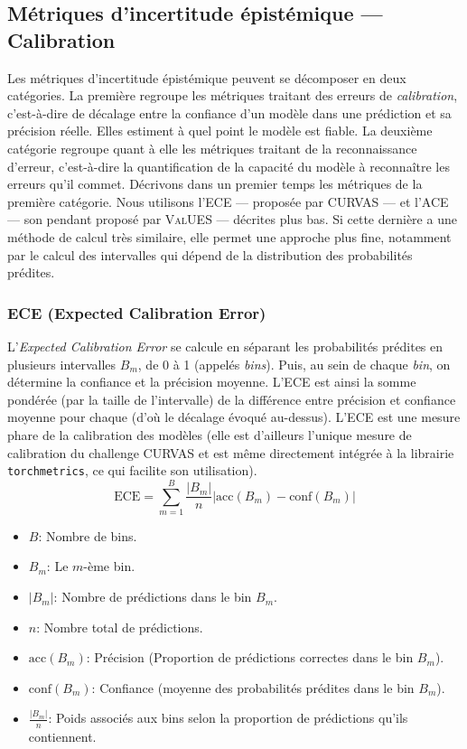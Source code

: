 \documentclass[a4paper,french,bookmarks,12pt]{article}
\begin{document}
    \subsection{Métriques d'incertitude épistémique --- Calibration}

    Les métriques d'incertitude épistémique peuvent se décomposer en deux catégories. La première regroupe les métriques traitant des erreurs de \emph{calibration}, c'est-à-dire de décalage entre la confiance d'un modèle dans une prédiction et sa précision réelle. Elles estiment à quel point le modèle est fiable. La deuxième catégorie regroupe quant à elle les métriques traitant de la reconnaissance d'erreur, c'est-à-dire la quantification de la capacité du modèle à reconnaître les erreurs qu'il commet. Décrivons dans un premier temps les métriques de la première catégorie. Nous utilisons l'ECE --- proposée par \textsc{CURVAS} --- et l'ACE --- son pendant proposé par \textsc{ValUES} --- décrites plus bas. Si cette dernière a une méthode de calcul très similaire, elle permet une approche plus fine, notamment par le calcul des intervalles qui dépend de la distribution des probabilités prédites.
    
    \subsubsection*{ECE (Expected Calibration Error)}

    L'\emph{Expected Calibration Error} se calcule en séparant les probabilités prédites en plusieurs intervalles $B_m$, de 0 à 1 (appelés \emph{bins}). Puis, au sein de chaque \emph{bin}, on détermine la confiance et la précision moyenne. L'ECE est ainsi la somme pondérée (par la taille de l'intervalle) de la différence entre précision et confiance moyenne pour chaque (d'où le décalage évoqué au-dessus). L'ECE est une mesure phare de la calibration des modèles (elle est d'ailleurs l'unique mesure de calibration du challenge CURVAS et est même directement intégrée à la librairie \texttt{torchmetrics}, ce qui facilite son utilisation).
    \[ \text{ECE} = \sum_{m=1}^{B} \frac{|B_m|}{n} \left| \text{acc}(B_m) - \text{conf}(B_m) \right| \]
    \begin{itemize}
        \item \( B \): Nombre de bins.
        \item \( B_m \): Le \( m \)-ème bin.
        \item \( |B_m| \): Nombre de prédictions dans le bin  \( B_m \).
        \item \( n \): Nombre total de prédictions.
        \item \( \text{acc}(B_m) \): Précision (Proportion de prédictions correctes dans le bin \( B_m \)).
        \item \( \text{conf}(B_m) \): Confiance (moyenne des probabilités prédites dans le bin \( B_m \)).
        \item \( \frac{|B_m|}{n} \): Poids associés aux bins selon la proportion de prédictions qu'ils contiennent.
    \end{itemize}
    
\end{document}
